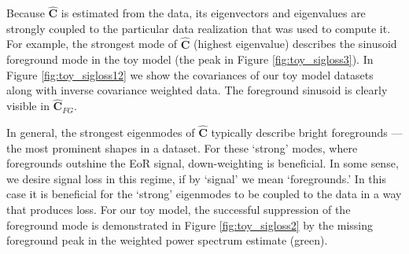\documentclass[preprint2,numberedappendix,tighten]{aastex6}  %
\begin{document}
Because $\widehat{\textbf{C}}$ is estimated from the data, its eigenvectors and eigenvalues are strongly coupled to the particular data realization that was used to compute it. For example, the strongest mode of $\widehat{\textbf{C}}$ (highest eigenvalue) describes the sinusoid foreground mode in the toy model (the peak in Figure \ref{fig:toy_sigloss3}). In Figure \ref{fig:toy_sigloss12} we show the covariances of our toy model datasets along with inverse covariance weighted data. The foreground sinusoid is clearly visible in $\widehat{\textbf{C}}_{FG}$.

In general, the strongest eigenmodes of $\widehat{\textbf{C}}$ typically describe bright foregrounds --- the most prominent shapes in a dataset. For these `strong' modes, where foregrounds outshine the EoR signal, down-weighting is beneficial. In some sense, we desire signal loss in this regime, if by `signal' we mean `foregrounds.' In this case it is beneficial for the `strong' eigenmodes to be coupled to the data in a way that produces loss. For our toy model, the successful suppression of the foreground mode is demonstrated in Figure \ref{fig:toy_sigloss2} by the missing foreground peak in the weighted power spectrum estimate (green).

\end{document}
